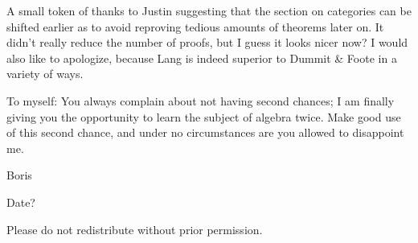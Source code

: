 A small token of thanks to Justin
suggesting that the section on categories can be shifted earlier
as to avoid reproving tedious amounts of theorems later on.
It didn't really reduce the number of proofs,
but I guess it looks nicer now?
I would also like to apologize,
because Lang is indeed superior to Dummit \& Foote in a variety of ways.

\medskip

To myself:
You always complain about not having second chances;
I am finally giving you the opportunity to learn the subject of algebra twice.
Make good use of this second chance,
and under no circumstances are you allowed to disappoint me.

\medskip

Boris

Date?

\vspace{5mm}

Please do not redistribute without prior permission.
